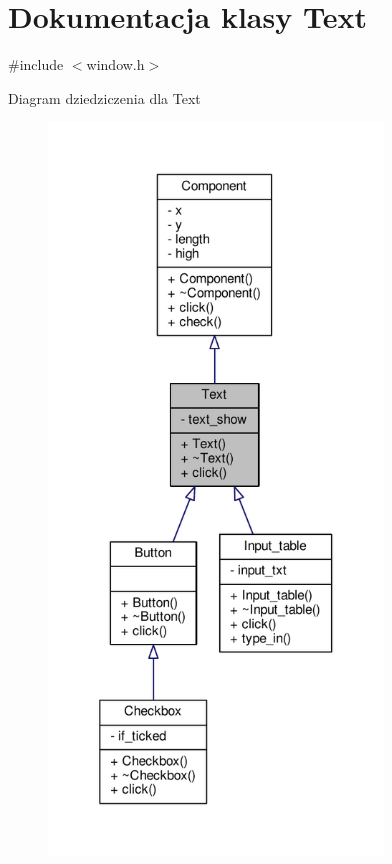 \hypertarget{classText}{}\section{Dokumentacja klasy Text}
\label{classText}


{\ttfamily \#include $<$window.\+h$>$}



Diagram dziedziczenia dla Text
\nopagebreak
\begin{figure}[H]
\begin{center}
\leavevmode
\includegraphics[height=550pt]{classText__inherit__graph}
\end{center}
\end{figure}


